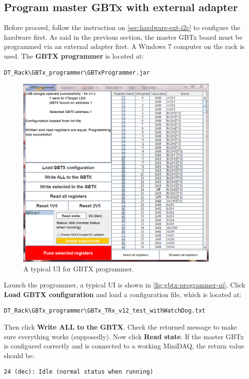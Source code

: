 \subsection{Program master GBTx with external \itwoc adapter}
Before proceed, follow the instruction on \autoref{sec:hardware-ext-i2c} to
configure the hardware first.
As said in the previous section, the master GBTx board must be programmed via an
external \itwoc adapter first.
A Windows 7 computer on the rack is used. The \textbf{GBTX programmer} is
located at:

\begin{verbatim}
DT_Rack\GBTx_programmer\GBTxProgrammer.jar
\end{verbatim}

\begin{figure}[ht]
    \centering
    \includegraphics[width=0.9\textwidth]{res/gbtx_programmer_v1_ui.png}
    \caption{A typical UI for GBTX programmer.}
    \label{fig:gbtx-programmer-ui}
\end{figure}

Launch the programmer, a typical UI is shown in
\autoref{fig:gbtx-programmer-ui},
Click \textbf{Load GBTX configuration} and load a configuration file, which is
located at:

\begin{verbatim}
DT_Rack\GBTx_programmer\GBTx_TRx_v12_test_withWatchDog.txt
\end{verbatim}

Then click \textbf{Write ALL to the GBTX}. Check the returned message to make
sure everything works (supposedly).
Now click \textbf{Read state}.
If the master GBTx is configured correctly and is connected to a working
MiniDAQ, the return value should be:

\begin{verbatim}
24 (dec): Idle (normal status when running)
\end{verbatim}
